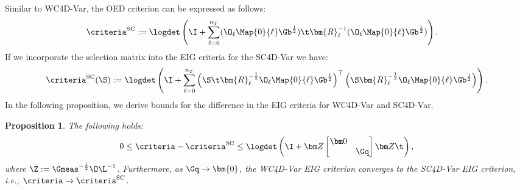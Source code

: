 \documentclass{aims} %
\newtheorem{proposition}[theorem]{Proposition}
\theoremstyle{definition}
\begin{document}
%
Similar to WC4D-Var,  the OED criterion  
can be expressed as follows:
%
\begin{align}
\begin{aligned}
   \criteria^\text{SC} := & \> \logdet\left(  \I +     
\sum_{\ell = 0}^{n_T}
  (\O_\ell \Map{0}{\ell} \Gb^{\frac 12})\t 
  \bm{R}_\ell^{-1}
  (\O_\ell \Map{0}{\ell}\Gb^{\frac 12})\right).
\end{aligned}\label{eq:EIG_SC}
\end{align}
%
If we incorporate the selection matrix into the EIG criteria for the SC4D-Var we have:
\[ \criteria^\text{SC} (\S) := 
 \logdet\left(  \I +     
\sum_{\ell = 0}^{n_T}
  \left(\S\t\bm{R}_\ell^{-\frac 12} \O_\ell \Map{0}{\ell} \Gb^{\frac 12}\right)^\top 
\left(\S\bm{R}_\ell^{-\frac 12} \O_\ell \Map{0}{\ell} \Gb^{\frac 12}\right)\right).
\] 
%
%
In the following proposition, we derive bounds for the difference in the EIG criteria for WC4D-Var and SC4D-Var. 
%
\begin{proposition}\label{proposition:bound_SCandWCoptCriteria}
The following holds: 
\begin{align} \label{eq:gapEIG_SC_WC}
    0\leq \criteria  -   \criteria^\text{SC} 
      \leq \logdet \left( \I+ \bm Z
\begin{bmatrix}
 \bm 0 &    \\
   &   \Gq
\end{bmatrix}
\bm Z\t\right),
\end{align}
where $\Z := \Gmeas^{-\frac 12} \O \L^{-1}$.
Furthermore, as $\Gq \to \bm{0}$, the WC4D-Var EIG criterion converges to the SC4D-Var EIG criterion, i.e., $\criteria \to \criteria^\text{SC}$.

\end{proposition}
\end{document}
